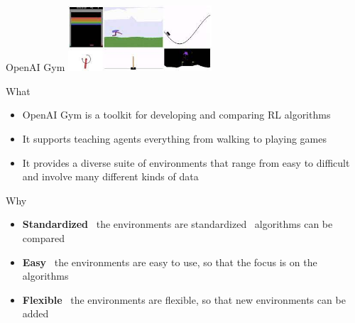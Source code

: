 \documentclass[presentation, 9pt]{beamer}\mode<presentation>{\usetheme{AMSBolognaFC}}
\begin{document}
\begin{frame}{OpenAI Gym}
	\centering
	\includegraphics[width=0.4\textwidth]{img/gym}
	\begin{block}{What}
		\begin{itemize}
			\item OpenAI Gym is a toolkit for developing and comparing RL algorithms
			\item It supports teaching agents everything from walking to playing games
			\item It provides a diverse suite of environments that range from easy to difficult and involve many different kinds of data
		\end{itemize}
	\end{block}
	\begin{block}{Why}
		\begin{itemize}
			\item \textbf{Standardized} \faArrowRight \, the environments are standardized \faArrowRight \, algorithms can be compared
			\item \textbf{Easy} \faArrowRight \, the environments are easy to use, so that the focus is on the algorithms
			\item \textbf{Flexible} \faArrowRight \, the environments are flexible, so that new environments can be added
		\end{itemize}
	\end{block}
\end{frame}
\end{document}
